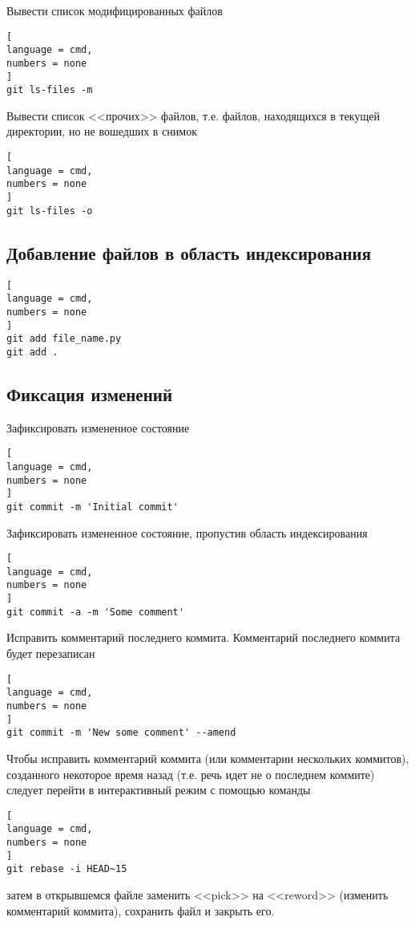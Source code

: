 \documentclass[%
	11pt,
	a4paper,
	utf8,
		]{article}
\begin{document}
Вывести список модифицированных файлов
\begin{lstlisting}[
language = cmd,
numbers = none
]
git ls-files -m
\end{lstlisting}

Вывести список <<прочих>> файлов, т.е. файлов, находящихся в текущей директории, но не вошедших в снимок
\begin{lstlisting}[
language = cmd,
numbers = none
]
git ls-files -o
\end{lstlisting}


\subsection{Добавление файлов в область индексирования}

\begin{lstlisting}[
language = cmd,
numbers = none
]
git add file_name.py
git add .
\end{lstlisting}


\subsection{Фиксация изменений}

Зафиксировать измененное состояние

\begin{lstlisting}[
language = cmd,
numbers = none
]
git commit -m 'Initial commit'
\end{lstlisting}

Зафиксировать измененное состояние, пропустив область индексирования

\begin{lstlisting}[
language = cmd,
numbers = none
]
git commit -a -m 'Some comment'
\end{lstlisting}

Исправить комментарий последнего коммита. Комментарий последнего коммита будет перезаписан

\begin{lstlisting}[
language = cmd,
numbers = none
]
git commit -m 'New some comment' --amend
\end{lstlisting}

Чтобы исправить комментарий коммита (или комментарии нескольких коммитов), созданного некоторое время назад (т.е. речь идет не о последнем коммите) следует перейти в интерактивный режим с помощью команды

\begin{lstlisting}[
language = cmd,
numbers = none
]
git rebase -i HEAD~15
\end{lstlisting}
затем в открывшемся файле заменить <<pick>> на <<reword>> (изменить комментарий коммита), сохранить файл и закрыть его.
\end{document}
